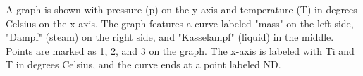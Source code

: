 A graph is shown with pressure (p) on the y-axis and temperature (T) in degrees Celsius on the x-axis. The graph features a curve labeled "mass" on the left side, "Dampf" (steam) on the right side, and "Kasselampf" (liquid) in the middle. Points are marked as 1, 2, and 3 on the graph. The x-axis is labeled with Ti and T in degrees Celsius, and the curve ends at a point labeled ND.